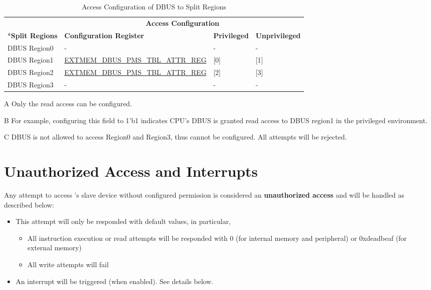 \documentclass[main\_\_EN.tex]{subfiles}
\begin{document}
\begin{table}[H]
    \centering
    \caption{Access Configuration of DBUS to Split Regions}
    \label{tab:dbus_acs_cache_pms}
    \begin{threeparttable}
    \begin{tabular}{ | l | l | l | l |}
    \hline
        \rowcolor{lightgray}
         & \multicolumn{3}{c|}{\textbf{Access Configuration}} \\\cline{2-4}
        \rowcolor{lightgray}
        \multirow{-2}*{\textbf{Split Regions}} & \textbf{Configuration Register} & \textbf{Privileged}\tnote{A} & \textbf{Unprivileged}\tnote{A}\\\hline
        DBUS Region0\tnote{C}  & - & - & - \\\hline
        DBUS Region1  & \hyperref[regdesc:EXTMEMDBUSPMSTBLATTRREG]{EXTMEM\_DBUS\_PMS\_TBL\_ATTR\_REG} & [0]\tnote{B} & [1]\\\hline
        DBUS Region2  & \hyperref[regdesc:EXTMEMDBUSPMSTBLATTRREG]{EXTMEM\_DBUS\_PMS\_TBL\_ATTR\_REG} & [2] & [3]\\\hline
        DBUS Region3\tnote{C}  & - & - & - \\\hline
    \end{tabular}
    \begin{tablenotes}
        \item[A] Only the read access can be configured.
        \item[B] For example, configuring this field to 1'b1 indicates CPU's DBUS is granted read access to DBUS region1 in the privileged environment.
        \item[C] DBUS is not allowed to access Region0 and Region3, thus cannot be configured. All attempts will be rejected.
        \end{tablenotes}
    \end{threeparttable}
\end{table}

\section{Unauthorized Access and Interrupts}


Any attempt to access \chipname{}'s slave device without configured permission is considered an \textbf{unauthorized access} and will be handled as described below:
\begin{itemize}
    \item This attempt will only be responded with default values, in particular,
    \begin{itemize}
        \item All instruction execution or read attempts will be responded with 0 (for internal memory and peripheral)  or 0xdeadbeaf (for external memory)
        \item All write attempts will fail
    \end{itemize}
    \item An interrupt will be triggered (when enabled). See details below.
\end{itemize}
\end{document}
